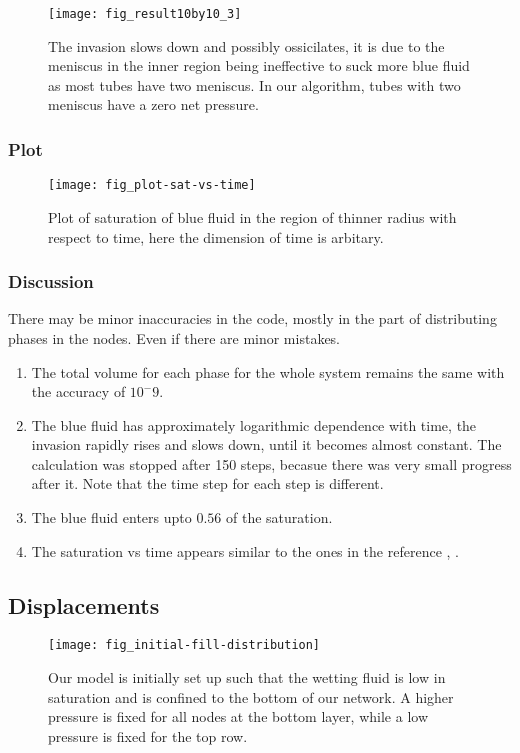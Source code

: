 		
		\begin{figure}[H]
			\texttt{[image: fig\_result10by10\_3]}
			\caption{The invasion slows down and possibly ossicilates, it is due to the meniscus in the inner region being ineffective to suck more blue fluid as most tubes have two meniscus. In our algorithm, tubes with two meniscus have a zero net pressure.}
			\label{fig_invasion-result3}
		\end{figure}
	
	\subsubsection{Plot}
		\begin{figure}[H]
			\centering
			\texttt{[image: fig\_plot-sat-vs-time]}
			\caption{Plot of saturation of blue fluid in the region of thinner radius with respect to time, here the dimension of time is arbitary.}
			\label{fig_plot-sat-vs-time}
		\end{figure}
		
	\subsubsection{Discussion}
		There may be minor inaccuracies in the code, mostly in the part of distributing phases in the nodes. Even if there are minor mistakes. 
		\begin{enumerate}
			\item The total volume for each phase for the whole system remains the same with the accuracy of $10^-9$.
			\item The blue fluid has approximately logarithmic dependence with time, the invasion rapidly rises and slows down, until it becomes almost constant. The calculation was stopped after 150 steps, becasue there was very small progress after it. Note that the time step for each step is different.
			\item The blue fluid enters upto $0.56$ of the saturation.
			\item The saturation vs time appears similar to the ones in the reference \cite{aker1998two}, \cite{fatt1956network}.
		\end{enumerate}

		
\subsection{Displacements}		

	\begin{figure}[H]
		\centering
		\texttt{[image: fig\_initial-fill-distribution]}
		\caption{Our model is initially set up such that the wetting fluid is low in saturation and is confined to the bottom of our network. A higher pressure is fixed for all nodes at the bottom layer, while a  low pressure is fixed for the top row.}
		\label{fig_plot-sat-vs-time-disp-one}
	\end{figure}
	

